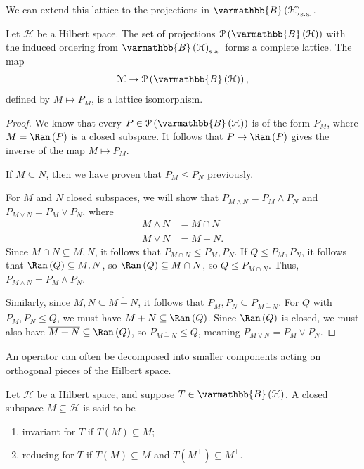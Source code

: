 \documentclass[10pt]{mypackage}
\renewcommand*{\mathbb}[1]{\varmathbb{#1}}
\newcommand{\sa}{\text{s.a.}}
\newcommand{\B}{\mathbb{B}}
\begin{document}
We can extend this lattice to the projections in $\B\left(\mathcal{H}\right)_{\sa}$.
\begin{proposition}
  Let $\mathcal{H}$ be a Hilbert space. The set of projections $\mathcal{P}\left(\B\left(\mathcal{H}\right)\right)$ with the induced ordering from $\B\left(\mathcal{H}\right)_{\sa}$ forms a complete lattice. The map
  \begin{align*}
    \mathcal{M}\rightarrow \mathcal{P}\left(\B\left(\mathcal{H}\right)\right),
  \end{align*}
  defined by $M\mapsto P_M$, is a lattice isomorphism.
\end{proposition}
\begin{proof}
  We know that every $P\in \mathcal{P}\left(\B\left(\mathcal{H}\right)\right)$ is of the form $P_M$, where $M = \Ran\left(P\right)$ is a closed subspace. It follows that $P\mapsto \Ran\left(P\right)$ gives the inverse of the map $M\mapsto P_M$.\newline

  If $M\subseteq N$, then we have proven that $P_M\leq P_N$ previously.\newline

  For $M$ and $N$ closed subspaces, we will show that $P_{M\wedge N} = P_M\wedge P_N$ and $P_{M\vee N} = P_M\vee P_N$, where
  \begin{align*}
    M\wedge N &= M\cap N\\
    M\vee N &= \overline{M+N}.
  \end{align*}
  Since $M\cap N\subseteq M,N$, it follows that $P_{M\cap N}\leq P_M,P_N$. If $Q\leq P_{M},P_N$, it follows that $\Ran\left(Q\right)\subseteq M,N$, so $\Ran\left(Q\right)\subseteq M\cap N$, so $Q\leq P_{M\cap N}$. Thus, $P_{M\wedge N} = P_M\wedge P_N$.\newline

  Similarly, since $M,N\subseteq \overline{M+N}$, it follows that $P_M,P_N\subseteq P_{\overline{M+N}}$. For $Q$ with $P_M,P_N\leq Q$, we must have $M+N\subseteq \Ran\left(Q\right)$. Since $\Ran\left(Q\right)$ is closed, we must also have $\overline{M+N}\subseteq \Ran\left(Q\right)$, so $P_{\overline{M+N}}\leq Q$, meaning $P_{M\vee N} = P_{M}\vee P_N$.
\end{proof}
An operator can often be decomposed into smaller components acting on orthogonal pieces of the Hilbert space.
\begin{definition}
  Let $\mathcal{H}$ be a Hilbert space, and suppose $T\in \B\left(\mathcal{H}\right)$. A closed subspace $M\subseteq \mathcal{H}$ is said to be
  \begin{enumerate}[(1)]
    \item invariant for $T$ if $T\left(M\right)\subseteq M$;
    \item reducing for $T$ if $T\left(M\right)\subseteq M$ and $T\left(M^{\perp}\right) \subseteq M^{\perp}$.
  \end{enumerate}
\end{definition}
\end{document}
